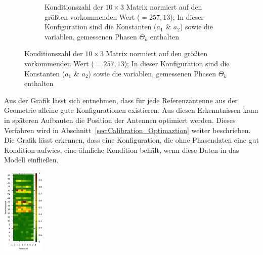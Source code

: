 \begin{figure}[h!]
\begin{subfigure}[t]{0.45\textwidth}
                 \caption{Konditionszahl der $10\times3$ Matrix normiert auf den größten vorkommenden Wert ($=257,13$); In dieser Konfiguration sind die Konstanten ($a_1$ \& $a_2$) sowie die variablen, gemessenen Phasen $\Theta_k$ enthalten}
                 \label{fig:AnalyzeOf10x3}
         \end{subfigure}
%
\end{figure}
%
Aus der Grafik lässt sich entnehmen, dass für jede Referenzantenne aus der Geometrie alleine gute Konfigurationen existieren. Aus diesen Erkenntnissen kann in späteren Aufbauten die Position der Antennen optimiert werden. Dieses Verfahren wird in Abschnitt~\ref{sec:Calibration_Optimaztion} weiter beschrieben. Die Grafik lässt erkennen, dass eine Konfiguration, die ohne Phasendaten eine gut Kondition aufwies, eine ähnliche Kondition behält, wenn diese Daten in das Modell einfließen.
\\

\begin{floatingfigure}[r!]{5cm}
 \centering
         \includegraphics[width=2cm]{img/ConditionPlot_scaled.png}
         \caption[Profil einer Phasenmessung222]{Normiertes Höhenprofil einer Phasenmessung aus der Sicht von Antenne 1 }
%         
\end{floatingfigure}
%
